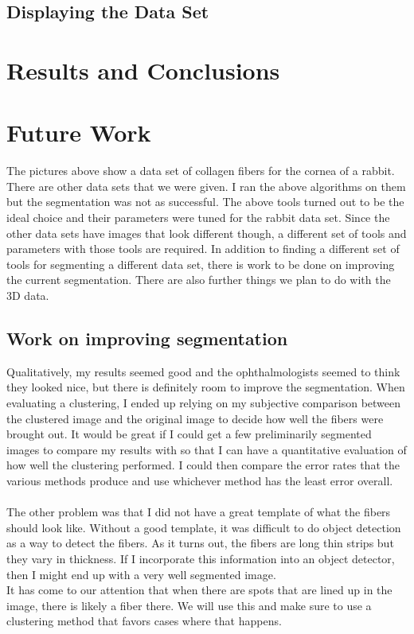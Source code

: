 \documentclass[11pt,psfig]{article}
\begin{document}
\subsection*{Displaying the Data Set}

\section*{Results and Conclusions}

\section*{Future Work}

The pictures above show a data set of collagen fibers for the cornea of a rabbit. There are other data sets that we were given. I ran the above algorithms on them but the segmentation was not as successful. The above tools turned out to be the ideal choice and their parameters were tuned for the rabbit data set. Since the other data sets have images that look different though, a different set of tools and parameters with those tools are required. In addition to finding a different set of tools for segmenting a different data set, there is work to be done on improving the current segmentation. There are also further things we plan to do with the 3D data. 

\subsection*{Work on improving segmentation}

Qualitatively, my results seemed good and the ophthalmologists seemed to think they looked nice, but there is definitely room to improve the segmentation. When evaluating a clustering, I ended up relying on my subjective comparison between the clustered image and the original image to decide how well the fibers were brought out. It would be great if I could get a few preliminarily segmented images to compare my results with so that I can have a quantitative evaluation of how well the clustering performed. I could then compare the error rates that the various methods produce and use whichever method has the least error overall. \\
\\
The other problem was that I did not have a great template of what the fibers should look like. Without a good template, it was difficult to do object detection as a way to detect the fibers. As it turns out, the fibers are long thin strips but they vary in thickness. If I incorporate this information into an object detector, then I might end up with a very well segmented image. 
\\
It has come to our attention that when there are spots that are lined up in the image, there is likely a fiber there. We will use this and make sure to use a clustering method that favors cases where that happens. 
\end{document}
